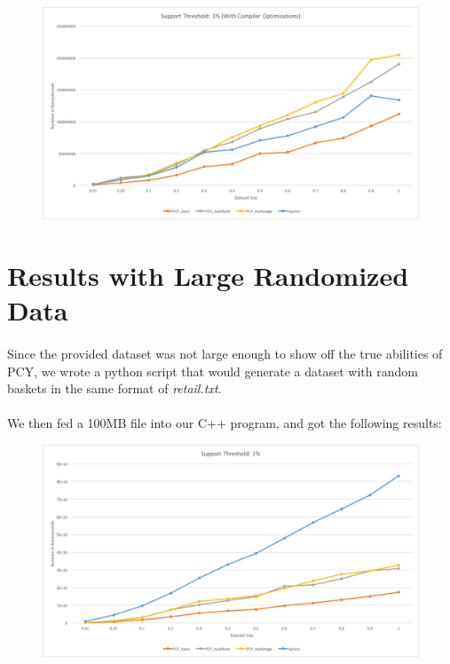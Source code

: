 \documentclass[11pt,letterpaper,titlepage]{article}
\begin{document}
		\begin{figure}[H]
			\includegraphics[width=\textwidth]{st1-opt}
		\end{figure}



	\section{Results with Large Randomized Data}
		\paragraph{}
			Since the provided dataset was not large enough to show off the true
			abilities of PCY, we wrote a python script that would generate a
			dataset with random baskets in the same format of \emph{retail.txt}.

		\paragraph{} We then fed a 100MB file into our C++ program, and got the
		following results:


		\begin{figure}[H]
			\includegraphics[width=\textwidth]{st1-big}
		\end{figure}
\end{document}
